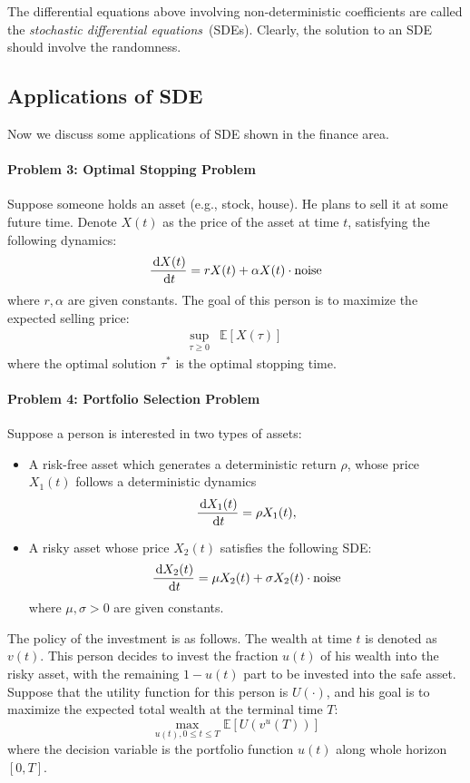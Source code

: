 \begin{remark}
The differential equations above involving non-deterministic coefficients are called the \emph{stochastic differential equations}~(SDEs).
Clearly, the solution to an SDE should involve the randomness.
\end{remark}


\subsection{Applications of SDE}
Now we discuss some applications of SDE shown in the finance area.
\paragraph{Problem 3: Optimal Stopping Problem} Suppose someone holds an asset 
(e.g., stock, house). 
He plans to sell it at some future time. 
Denote $X(t)$ as the price of the asset at time $t$, satisfying the following dynamics:
\[
\frac{\,\mathrm{d} X(t)}{\,\mathrm{d} t}=rX(t)+\alpha X(t)\cdot\mbox{noise}
\]
where $r,\alpha$ are given constants. 
The goal of this person is to maximize the expected selling price:
\[
\begin{array}{ll}
\sup\limits_{\tau\ge0}
&
\mathbb{E}[X(\tau)]
\end{array}
\]
where the optimal solution $\tau^*$ is the optimal stopping time.

\paragraph{Problem 4: Portfolio Selection Problem}
Suppose a person is interested in two types of assets:
\begin{itemize}
\item
A risk-free asset which generates a deterministic return $\rho$, whose price $X_1(t)$ follows a deterministic dynamics
\[
\frac{\,\mathrm{d} X_1(t)}{\,\mathrm{d} t}=\rho X_1(t),
\]
\item
A risky asset whose price $X_2(t)$ satisfies the following SDE:
\[
\frac{\,\mathrm{d} X_2(t)}{\,\mathrm{d} t}=\mu X_2(t)+\sigma X_2(t)\cdot\mbox{noise}
\]
where $\mu,\sigma>0$ are given constants.
\end{itemize}
The policy of the investment is as follows.
The wealth at time $t$ is denoted as $v(t)$. 
This person decides to invest the fraction $u(t)$ of his wealth into the risky asset, with the remaining $1-u(t)$ part to be invested into the safe asset. 
Suppose that the utility function for this person is $U(\cdot)$, and his goal is to maximize the expected total wealth at the terminal time $T$:
\[
\max_{u(t),0\le t\le T}\mathbb{E}[U(v^u(T))]
\]
where the decision variable is the portfolio function $u(t)$ along whole horizon $[0,T]$.


